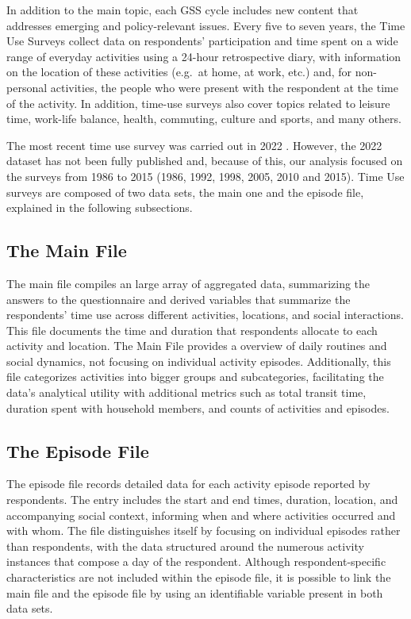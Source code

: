\documentclass[Royal,times,sageh]{sagej}
\begin{document}
In addition to the main topic, each GSS cycle includes new content that
addresses emerging and policy-relevant issues. Every five to seven
years, the Time Use Surveys \citep{statisticscanada2022} collect data on
respondents' participation and time spent on a wide range of everyday
activities using a 24-hour retrospective diary, with information on the
location of these activities (e.g.~at home, at work, etc.) and, for
non-personal activities, the people who were present with the respondent
at the time of the activity. In addition, time-use surveys also cover
topics related to leisure time, work-life balance, health, commuting,
culture and sports, and many others.

The most recent time use survey was carried out in 2022
\citep{wray2024}. However, the 2022 dataset has not been fully published
and, because of this, our analysis focused on the surveys from 1986 to
2015 (1986, 1992, 1998, 2005, 2010 and 2015). Time Use surveys are
composed of two data sets, the main one and the episode file, explained
in the following subsections.

\hypertarget{the-main-file}{%
\subsection{The Main File}\label{the-main-file}}

The main file compiles an large array of aggregated data, summarizing
the answers to the questionnaire and derived variables that summarize
the respondents' time use across different activities, locations, and
social interactions. This file documents the time and duration that
respondents allocate to each activity and location. The Main File
provides a overview of daily routines and social dynamics, not focusing
on individual activity episodes. Additionally, this file categorizes
activities into bigger groups and subcategories, facilitating the data's
analytical utility with additional metrics such as total transit time,
duration spent with household members, and counts of activities and
episodes.

\hypertarget{the-episode-file}{%
\subsection{The Episode File}\label{the-episode-file}}

The episode file records detailed data for each activity episode
reported by respondents. The entry includes the start and end times,
duration, location, and accompanying social context, informing when and
where activities occurred and with whom. The file distinguishes itself
by focusing on individual episodes rather than respondents, with the
data structured around the numerous activity instances that compose a
day of the respondent. Although respondent-specific characteristics are
not included within the episode file, it is possible to link the main
file and the episode file by using an identifiable variable present in
both data sets.
\end{document}
